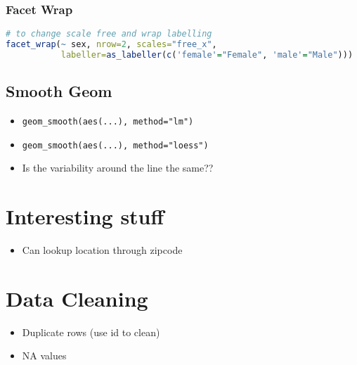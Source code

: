 \documentclass{article}
\begin{document}
\begin{multicols}{2}
\subsubsection{Facet Wrap}
\begin{lstlisting}[language=R]
# to change scale free and wrap labelling
facet_wrap(~ sex, nrow=2, scales="free_x",
           labeller=as_labeller(c('female'="Female", 'male'="Male")))
\end{lstlisting}

\subsection{Smooth Geom}
\begin{itemize}
	\item \texttt{geom\_smooth(aes(...), method="lm")}
	\item \texttt{geom\_smooth(aes(...), method="loess")}
	\item Is the variability around the line the same??
\end{itemize}

\section{Interesting stuff}
\begin{itemize}
	\item Can lookup location through zipcode
\end{itemize}

\section{Data Cleaning}
\begin{itemize}
	\item Duplicate rows (use id to clean)
	\item NA values
\end{itemize}
\end{multicols}
\end{document}
